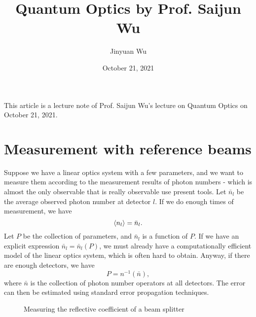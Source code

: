 \documentclass[hyperref, a4paper]{article}
\title{Quantum Optics by Prof. Saijun Wu}
\author{Jinyuan Wu}
\date{October 21, 2021}
\begin{document}
\maketitle

This article is a lecture note of Prof. Saijun Wu's lecture on Quantum Optics on October 21, 2021.

\section{Measurement with reference beams}

Suppose we have a linear optics system with a few parameters, 
and we want to measure them according to the measurement results of photon numbers
- which is almost the only observable that is really observable use present tools.
Let $\bar{n}_l$ be the average observed photon number at detector $l$. 
If we do enough times of measurement, we have 
\begin{equation}
    \expval{n_l} = \bar{n}_l.
\end{equation}
Let $P$ be the collection of parameters, and $\bar{n}_l$ is a function of $P$.
If we have an explicit expression $\bar{n}_l = \bar{n}_l(P)$, we must already have a computationally efficient model of the linear optics system, which is often hard to obtain.
Anyway, if there are enough detectors, we have 
\begin{equation}
    P = n^{-1}(\bar{n}),
\end{equation}
where $\bar{n}$ is the collection of photon number operators at all detectors.
The error can then be estimated using standard error propagation techniques.

\begin{figure}
    \centering
    
    \caption{Measuring the reflective coefficient of a beam splitter}
    \label{fig:measure-mean-splitter}
\end{figure}
\end{document}
